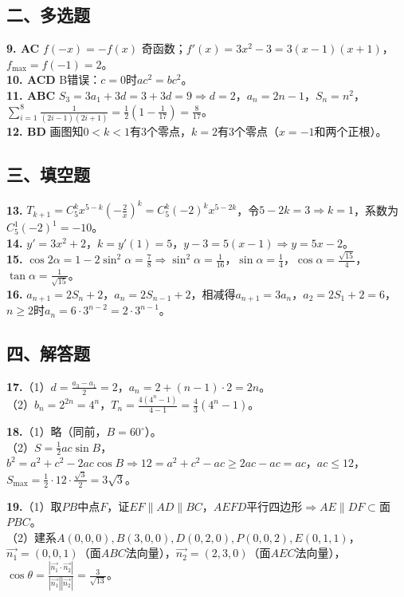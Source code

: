 \documentclass[12pt,a4paper]{ctexart}
\begin{document}
\subsection*{二、多选题}
\textbf{9. AC} $f(-x)=-f(x)$ 奇函数；$f'(x)=3x^2-3=3(x-1)(x+1)$，$f_{\max}=f(-1)=2$。\\
\textbf{10. ACD} B错误：$c=0$时$ac^2=bc^2$。\\
\textbf{11. ABC} $S_3=3a_1+3d=3+3d=9\Rightarrow d=2$，$a_n=2n-1$，$S_n=n^2$，$\sum_{i=1}^{8}\frac1{(2i-1)(2i+1)}=\frac12(1-\frac1{17})=\frac8{17}$。\\
\textbf{12. BD} 画图知$0<k<1$有3个零点，$k=2$有3个零点（$x=-1$和两个正根）。

\subsection*{三、填空题}
\textbf{13.} $T_{k+1}=C_5^k x^{5-k}(-\frac{2}{x})^k=C_5^k(-2)^k x^{5-2k}$，令$5-2k=3\Rightarrow k=1$，系数为$C_5^1(-2)^1=-10$。\\
\textbf{14.} $y'=3x^2+2$，$k=y'(1)=5$，$y-3=5(x-1)\Rightarrow y=5x-2$。\\
\textbf{15.} $\cos2\alpha=1-2\sin^2\alpha=\frac78\Rightarrow\sin^2\alpha=\frac1{16}$，$\sin\alpha=\frac14$，$\cos\alpha=\frac{\sqrt{15}}{4}$，$\tan\alpha=\frac1{\sqrt{15}}$。 \\
\textbf{16.} $a_{n+1}=2S_n+2$，$a_n=2S_{n-1}+2$，相减得$a_{n+1}=3a_n$，$a_2=2S_1+2=6$，$n\ge2$时$a_n=6\cdot3^{n-2}=2\cdot3^{n-1}$。

\subsection*{四、解答题}
\textbf{17.}（1）$d=\frac{a_3-a_1}{2}=2$，$a_n=2+(n-1)\cdot2=2n$。\\
（2）$b_n=2^{2n}=4^n$，$T_n=\frac{4(4^n-1)}{4-1}=\frac43(4^n-1)$。

\textbf{18.}（1）略（同前，$B=60^\circ$）。\\
（2）$S=\frac12ac\sin B$，$b^2=a^2+c^2-2ac\cos B\Rightarrow12=a^2+c^2-ac\ge2ac-ac=ac$，$ac\le12$，$S_{\max}=\frac12\cdot12\cdot\frac{\sqrt3}{2}=3\sqrt3$。

\textbf{19.}（1）取$PB$中点$F$，证$EF\parallel AD\parallel BC$，$AEFD$平行四边形$\Rightarrow AE\parallel DF\subset$面$PBC$。\\
（2）建系$A(0,0,0),B(3,0,0),D(0,2,0),P(0,0,2),E(0,1,1)$，$\vec{n_1}=(0,0,1)$（面$ABC$法向量），$\vec{n_2}=(2,3,0)$（面$AEC$法向量），$\cos\theta=\frac{|\vec{n_1}\cdot\vec{n_2}|}{|\vec{n_1}||\vec{n_2}|}=\frac{3}{\sqrt{13}}$。
\end{document}
